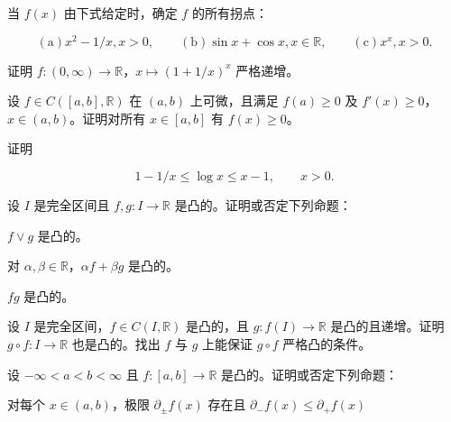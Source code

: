 \begin{exercises}
\item[8.]

当 $f(x)$ 由下式给定时，确定 $f$ 的所有拐点：

\[
\mathrm{(a)}x^{2}-1/x,x>0,\qquad\mathrm{(b)}\sin x+\cos x,x\in\mathbb{R},\qquad\mathrm{(c)}x^{x},x>0.
\]
\item[9.]

证明 $ f: (0, \infty) \to \mathbb{R} $，$ x \mapsto (1 + 1/x)^x $ 严格递增。

\item[10.]

设 $ f \in C([a, b], \mathbb{R}) $ 在 $ (a, b) $ 上可微，且满足 $ f(a) \geq 0 $ 及 $ f'(x) \geq 0 $，$ x \in (a, b) $。证明对所有 $ x \in [a, b] $ 有 $ f(x) \geq 0 $。

\item[11.]

证明

\[
1-1/x\leq\log x\leq x-1,\qquad x>0.
\]
\item[12.]

设 $ I $ 是完全区间且 $ f, g: I \to \mathbb{R} $ 是凸的。证明或否定下列命题：

\begin{items}
\item

$ f \lor g $ 是凸的。

\item

对 $ \alpha, \beta \in \mathbb{R} $，$ \alpha f + \beta g $ 是凸的。

\item

$fg$ 是凸的。

\end{items}

\item[13.]

设 $I$ 是完全区间，$f \in C(I, \mathbb{R})$ 是凸的，且 $g: f(I) \to \mathbb{R}$ 是凸的且递增。证明 $g \circ f: I \to \mathbb{R}$ 也是凸的。找出 $f$ 与 $g$ 上能保证 $g \circ f$ 严格凸的条件。

\item[14.]

设 $ -\infty < a < b < \infty $ 且 $ f: [a, b] \to \mathbb{R} $ 是凸的。证明或否定下列命题：

\begin{items}
\item

对每个 $ x \in (a, b) $，极限 $ \partial_{\pm} f(x) $ 存在且 $ \partial_{-} f(x) \leq \partial_{+} f(x) $


\end{items}
\end{exercises}
